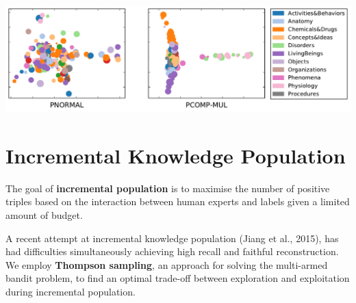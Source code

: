 \documentclass[a0,landscape]{a0poster}
\begin{document}
\begin{multicols}{3}
\begin{center}
\includegraphics[width=0.9\linewidth]{../cikm2016/images/embedding_umls.pdf}
\end{center}


\section{Incremental Knowledge Population}

The goal of \textbf{incremental population} is to maximise the number of positive triples based on the interaction between human experts and labels given a limited amount of budget.

A recent attempt at incremental knowledge population (Jiang et al., 2015), has had difficulties simultaneously achieving high recall and faithful reconstruction. We employ \textbf{Thompson sampling}, an approach for solving the multi-armed bandit problem, to find an optimal trade-off between exploration and exploitation during incremental population.


\end{multicols}
\end{document}
